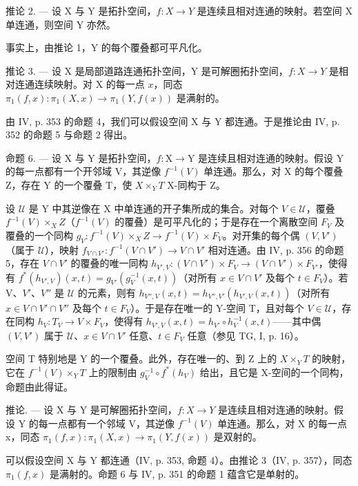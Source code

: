 推论 2. --- 设 X 与 Y 是拓扑空间，\(f: X \to Y\) 是连续且相对连通的映射。若空间 X 单连通，则空间 Y 亦然。

事实上，由推论 1，Y 的每个覆叠都可平凡化。

推论 3. --- 设 X 是局部道路连通拓扑空间，Y 是可解圈拓扑空间，\(f: X \to Y\) 是相对连通连续映射。对 X 的每一点 \(x\)，同态 \(\pi_1(f, x): \pi_1(X, x) \to \pi_1(Y, f(x))\) 是满射的。

由 IV, p. 353 的命题 4，我们可以假设空间 X 与 Y 都连通。于是推论由 IV, p. 352 的命题 5 与命题 2 得出。

命题 6. --- 设 X 与 Y 是拓扑空间，\(f: \mathrm{X} \to \mathrm{Y}\) 是连续且相对连通的映射。假设 Y 的每一点都有一个开邻域 V，其逆像 \(f^{-1}(V)\) 单连通。那么，对 X 的每个覆叠 Z，存在 Y 的一个覆叠 T，使 \(X \times_{Y} T\) X-同构于 Z。

设 \(\mathcal{U}\) 是 Y 中其逆像在 X 中单连通的开子集所成的集合。对每个 \(V \in \mathcal{U}\)，覆叠 \(f^{-1}(V) \times_{X} Z\)（\(f^{-1}(V)\) 的覆叠）是可平凡化的；于是存在一个离散空间 \(F_V\) 及覆叠的一个同构 \(g_V: f^{-1}(V) \times_{X} Z \to f^{-1}(V) \times F_V\)。对开集的每个偶 \((V, V')\)（属于 \(\mathcal{U}\)），映射 \(f_{V \cap V'}: f^{-1}(V \cap V') \to V \cap V'\) 相对连通。由 IV, p. 356 的命题 5，存在 \(V \cap V'\) 的覆叠的唯一同构 \(h_{V',V}: (V \cap V') \times F_V \to (V \cap V') \times F_{V'}\)，使得有 \(f^*(h_{V',V})(x,t) = g_{V'}(g_V^{-1}(x,t))\)（对所有 \(x \in V \cap V'\) 及每个 \(t \in F_V\)）。若 V、\(V'\)、\(V''\) 是 \(\mathcal{U}\) 的元素，则有 \(h_{V'',V}(x,t) = h_{V'',V'}(h_{V',V}(x,t))\)（对所有 \(x \in V \cap V' \cap V''\) 及每个 \(t \in F_V\)）。于是存在唯一的 Y-空间 T，且对每个 \(V \in \mathcal{U}\)，存在同构 \(h_V: T_V \to V \times F_V\)，使得有 \(h_{V',V}(x,t) = h_{V'} \circ h_V^{-1}(x,t)\)——其中偶 \((V, V')\) 属于 \(\mathcal{U}\)、\(x \in V \cap V'\) 任意、\(t \in F_V\) 任意（参见 TG, I, p. 16）。

空间 T 特别地是 Y 的一个覆叠。此外，存在唯一的、到 Z 上的 \(X \times_{Y} T\) 的映射，它在 \(f^{-1}(V) \times_{Y} T\) 上的限制由 \(g_{V}^{-1} \circ f^{*}(h_{V})\) 给出，且它是 X-空间的一个同构，命题由此得证。

推论. --- 设 X 与 Y 是可解圈拓扑空间，\(f: X \to Y\) 是连续且相对连通的映射。假设 Y 的每一点都有一个邻域 V，其逆像 \(f^{-1}(V)\) 单连通。那么，对 X 的每一点 x，同态 \(\pi_{1}(f,x): \pi_{1}(X,x) \to \pi_{1}(Y,f(x))\) 是双射的。

可以假设空间 X 与 Y 都连通（IV, p. 353, 命题 4）。由推论 3（IV, p. 357），同态 \(\pi_1(f,x)\) 是满射的。命题 6 与 IV, p. 351 的命题 1 蕴含它是单射的。

